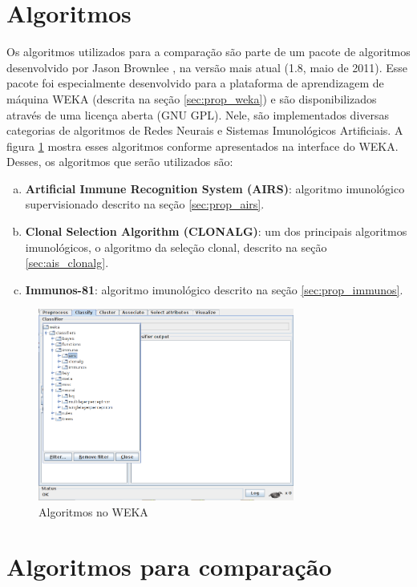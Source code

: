 \section{Algoritmos}

Os algoritmos utilizados para a comparação são parte de um pacote de algoritmos desenvolvido por Jason Brownlee \cite{Brownlee2011}, na versão mais atual (1.8, maio de 2011). Esse pacote foi especialmente desenvolvido para a plataforma de aprendizagem de máquina WEKA (descrita na seção \ref{sec:prop_weka}) e são disponibilizados através de uma licença aberta (GNU GPL). Nele, são implementados diversas categorias de algoritmos de Redes Neurais e Sistemas Imunológicos Artificiais. A figura \ref{fig:prop_wekaais} mostra esses algoritmos conforme apresentados na interface do WEKA. Desses, os algoritmos que serão utilizados são:

\begin{enumerate}[a)]
    \item \textbf{Artificial Immune Recognition System (AIRS)}: algoritmo imunológico supervisionado descrito na seção \ref{sec:prop_airs}.
    \item \textbf{Clonal Selection Algorithm (CLONALG)}: um dos principais algoritmos imunológicos, o algoritmo da seleção clonal, descrito na seção \ref{sec:ais_clonalg}.
    \item \textbf{Immunos-81}: algoritmo imunológico descrito na seção \ref{sec:prop_immunos}.
\end{enumerate}

\begin{figure}[h!]
    \centering
    \caption{Algoritmos no WEKA}
    \label{fig:prop_wekaais}
    \includegraphics[width=0.75\textwidth]{img/weka_ais.png}
\end{figure}

\section{Algoritmos para comparação}


